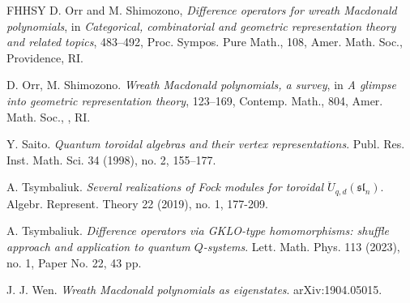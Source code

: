 \documentclass{amsart}
\theoremstyle{remark}
\numberwithin{thm}{section}
\numberwithin{equation}{section}
\begin{document}
\begin{thebibliography}{FHHSY}
D. Orr and M. Shimozono, 
\textit{Difference operators for wreath Macdonald polynomials}, in {\it Categorical, combinatorial and geometric representation theory and related topics}, 483--492, Proc. Sympos. Pure Math., 108, Amer. Math. Soc., Providence, RI.

D. Orr, M. Shimozono.
\textit{Wreath Macdonald polynomials, a survey}, in {\it A glimpse into geometric representation theory}, 123--169, Contemp. Math., 804, Amer. Math. Soc., , RI.

Y. Saito.
\textit{Quantum toroidal algebras and their vertex representations}.
Publ. Res. Inst. Math. Sci. 34 (1998), no. 2, 155–177.

A. Tsymbaliuk.
\textit{Several realizations of Fock modules for toroidal $\ddot{U}_{q,d}(\mathfrak{sl}_n)$}.
Algebr. Represent. Theory 22 (2019), no. 1, 177-209.

A. Tsymbaliuk.
\textit{Difference operators via GKLO-type homomorphisms: shuffle approach and application to quantum $Q$-systems}.
Lett. Math. Phys. 113 (2023), no. 1, Paper No. 22, 43 pp.

J. J. Wen.
\textit{Wreath Macdonald polynomials as eigenstates}. arXiv:1904.05015.

\end{thebibliography}
\end{document}
